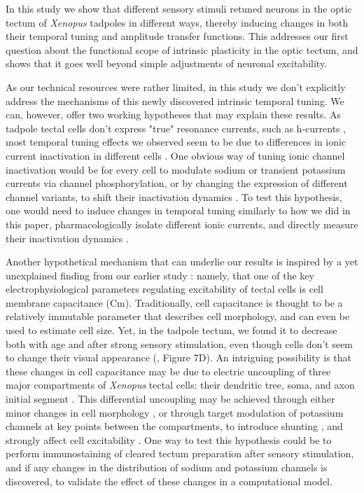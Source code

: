 \documentclass{article}
\begin{document}
In this study we show that different sensory stimuli retuned neurons in the optic tectum of \textit{Xenopus} tadpoles in different ways, thereby inducing changes in both their temporal tuning and amplitude transfer functions. This addresses our first question about the functional scope of intrinsic plasticity in the optic tectum, and shows that it goes well beyond simple adjustments of neuronal excitability.

As our technical resources were rather limited, in this study we don't explicitly address the mechanisms of this newly discovered intrinsic temporal tuning. We can, however, offer two working hypotheses that may explain these results. As tadpole tectal cells don't express "true" resonance currents, such as h-currents \citep{ciarleglio2015}, most temporal tuning effects we observed seem to be due to differences in ionic current inactivation in different cells \citep{azouz2000threshold,fontaine2014threshold}. One obvious way of tuning ionic channel inactivation would be for every cell to modulate sodium or transient potassium currents via channel phosphorylation, or by changing the expression of different channel variants, to shift their inactivation dynamics \citep{frank2003nachannels,goldwyn2018a_current}. To test this hypothesis, one would need to induce changes in temporal tuning similarly to how we did in this paper, pharmacologically isolate different ionic currents, and directly measure their inactivation dynamics \citep{zbili2019axonnav}.

Another hypothetical mechanism that can underlie our results is inspired by a yet unexplained finding from our earlier study \citep{ciarleglio2015}: namely, that one of the key electrophysiological parameters regulating excitability of tectal cells is cell membrane capacitance (Cm). Traditionally, cell capacitance is thought to be a relatively immutable parameter that describes cell morphology, and can even be used to estimate cell size. Yet, in the tadpole tectum, we found it to decrease both with age and after strong sensory stimulation, even though cells don't seem to change their visual appearance (\citealt{ciarleglio2015}, Figure 7D). An intriguing possibility is that these changes in cell capacitance may be due to electric uncoupling of three major compartments of \textit{Xenopus} tectal cells: their dendritic tree, soma, and axon initial segment \citep{bollmann2009,jarvis2018morphology}. This differential uncoupling may be achieved through either minor changes in cell morphology \citep{leterrier2018axon}, or through target modulation of potassium channels at key points between the compartments, to introduce shunting \citep{murakoshi1997kv2phosphorilation}, and strongly affect cell excitability \citep{grubb2010activity,kuba2010initial}. One way to test this hypothesis could be to perform immunostaining of cleared tectum preparation after sensory stimulation, and if any changes in the distribution of sodium and potassium channels is discovered, to validate the effect of these changes in a computational model.
\end{document}

